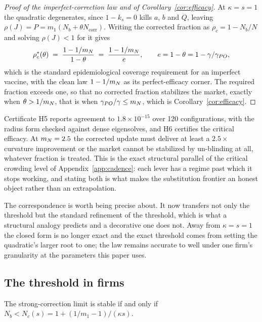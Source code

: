 \begin{proof}[Proof of the imperfect-correction law and of Corollary~\ref{cor:efficacy}]
At $\kappa = s = 1$ the quadratic degenerates, since $1-k_s = 0$ kills $a$, $b$ and $Q$, leaving $\rho(J) = P = m_1(N_b + \theta N_{\text{corr}})$. Writing the corrected fraction as $\rho_c = 1 - N_b/N$ and solving $\rho(J) < 1$ for it gives
\[
  \rho_c^\ast(\theta) \;=\; \frac{1 - 1/m_N}{1-\theta} \;=\; \frac{1-1/m_N}{e}, \qquad e = 1-\theta = 1 - \gamma/\gamma_{PO},
\]
which is the standard epidemiological coverage requirement for an imperfect vaccine, with the clean law $1-1/m_N$ as its perfect-efficacy corner. The required fraction exceeds one, so that no corrected fraction stabilizes the market, exactly when $\theta > 1/m_N$, that is when $\gamma_{PO}/\gamma \leq m_N$, which is Corollary~\ref{cor:efficacy}.
\end{proof}

Certificate H5 reports agreement to $1.8\times 10^{-15}$ over 120 configurations, with the radius form checked against dense eigensolves, and H6 certifies the critical efficacy. At $m_N = 2.5$ the corrected update must deliver at least a $2.5\times$ curvature improvement or the market cannot be stabilized by un-blinding at all, whatever fraction is treated. This is the exact structural parallel of the critical crowding level of Appendix~\ref{app:cadence}: each lever has a regime past which it stops working, and stating both is what makes the substitution frontier an honest object rather than an extrapolation.

The correspondence is worth being precise about. It now transfers not only the threshold but the standard refinement of the threshold, which is what a structural analogy predicts and a decorative one does not. Away from $\kappa = s = 1$ the closed form is no longer exact and the exact threshold comes from setting the quadratic's larger root to one; the law remains accurate to well under one firm's granularity at the parameters this paper uses.

\subsection{The threshold in firms}

\begin{aproposition}
\label{aprop:Nc}
The strong-correction limit is stable if and only if $N_b < N_c(s) = 1 + (1/m_1 - 1)/(\kappa s)$.
\end{aproposition}


